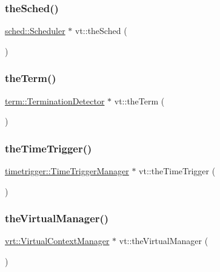 \mbox{\label{namespacevt_a4508b38e6ab664b64f1415aecbb83571}} 
\subsubsection{\texorpdfstring{the\+Sched()}{theSched()}}
{\footnotesize\ttfamily \hyperlink{structvt_1_1sched_1_1_scheduler}{sched\+::\+Scheduler} $\ast$ vt\+::the\+Sched (\begin{DoxyParamCaption}{ }\end{DoxyParamCaption})}

\mbox{\label{namespacevt_a127580fdfcaba0b4171e5c48c5676733}} 
\subsubsection{\texorpdfstring{the\+Term()}{theTerm()}}
{\footnotesize\ttfamily \hyperlink{structvt_1_1term_1_1_termination_detector}{term\+::\+Termination\+Detector} $\ast$ vt\+::the\+Term (\begin{DoxyParamCaption}{ }\end{DoxyParamCaption})}

\mbox{\label{namespacevt_a1e1a39cdf2a3fc1adefcdfcca4716bf2}} 
\subsubsection{\texorpdfstring{the\+Time\+Trigger()}{theTimeTrigger()}}
{\footnotesize\ttfamily \hyperlink{structvt_1_1timetrigger_1_1_time_trigger_manager}{timetrigger\+::\+Time\+Trigger\+Manager} $\ast$ vt\+::the\+Time\+Trigger (\begin{DoxyParamCaption}{ }\end{DoxyParamCaption})}

\mbox{\label{namespacevt_ad46b232b74b745991314a4a509c648f9}} 
\subsubsection{\texorpdfstring{the\+Virtual\+Manager()}{theVirtualManager()}}
{\footnotesize\ttfamily \hyperlink{structvt_1_1vrt_1_1_virtual_context_manager}{vrt\+::\+Virtual\+Context\+Manager} $\ast$ vt\+::the\+Virtual\+Manager (\begin{DoxyParamCaption}{ }\end{DoxyParamCaption})}

